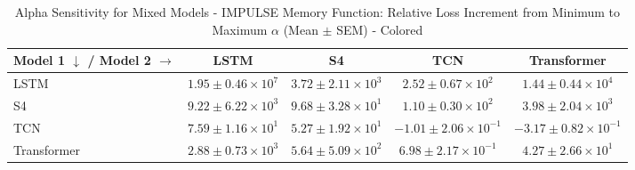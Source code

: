 
\begin{table}[h]
\centering
\caption{Alpha Sensitivity for Mixed Models - IMPULSE Memory Function: Relative Loss Increment from Minimum to Maximum $\alpha$ (Mean $\pm$ SEM) - Colored}
\label{tab:mixed_alpha_sensitivity_impulse_colored}
\begin{tabular}{lcccc}
\hline
Model 1 $\downarrow$ / Model 2 $\rightarrow$ & LSTM & S4 & TCN & Transformer \\
\hline
LSTM & \cellcolor{gray!20}$1.95 \pm 0.46 \times 10^{7}$ & \cellcolor{green!30!white}$3.72 \pm 2.11 \times 10^{3}$ & \cellcolor{green!30!white}$2.52 \pm 0.67 \times 10^{2}$ & \cellcolor{green!30!white}$1.44 \pm 0.44 \times 10^{4}$ \\
S4 & \cellcolor{green!30!white}$9.22 \pm 6.22 \times 10^{3}$ & \cellcolor{gray!20}$9.68 \pm 3.28 \times 10^{1}$ & \cellcolor{red!30!white}$1.10 \pm 0.30 \times 10^{2}$ & \cellcolor{red!30!white}$3.98 \pm 2.04 \times 10^{3}$ \\
TCN & \cellcolor{green!30!white}$7.59 \pm 1.16 \times 10^{1}$ & \cellcolor{red!5!white}$5.27 \pm 1.92 \times 10^{1}$ & \cellcolor{gray!20}$-1.01 \pm 2.06 \times 10^{-1}$ & \cellcolor{green!30!white}$-3.17 \pm 0.82 \times 10^{-1}$ \\
Transformer & \cellcolor{green!30!white}$2.88 \pm 0.73 \times 10^{3}$ & \cellcolor{red!30!white}$5.64 \pm 5.09 \times 10^{2}$ & \cellcolor{green!30!white}$6.98 \pm 2.17 \times 10^{-1}$ & \cellcolor{gray!20}$4.27 \pm 2.66 \times 10^{1}$ \\
\hline
\end{tabular}
\end{table}
